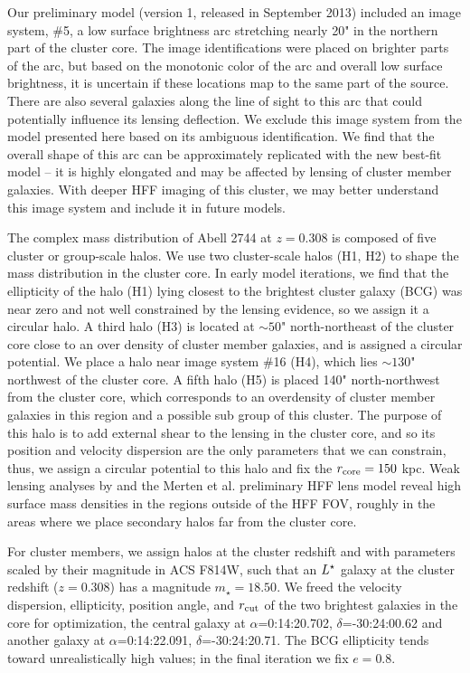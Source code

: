 Our preliminary model (version 1, released in September 2013) included an image system, \#5, a low surface brightness arc stretching nearly 20" in the northern part of the cluster core. The image identifications were placed on brighter parts of the arc, but based on the monotonic color of the arc and overall low surface brightness, it is uncertain if these locations map to the same part of the source. There are also several galaxies along the line of sight to this arc that could potentially influence its lensing deflection. We exclude this image system from the model presented here based on its ambiguous identification. We find that the overall shape of this arc can be approximately replicated with the new best-fit model -- it is highly elongated and may be affected by lensing of cluster member galaxies. With deeper HFF imaging of this cluster, we may better understand this image system and include it in future models.

The complex mass distribution of Abell 2744 at $z=0.308$ is composed of five cluster or group-scale halos. We use two cluster-scale halos (H1, H2) to shape the mass distribution in the cluster core. In early model iterations, we find that the ellipticity of the halo (H1) lying closest to the brightest cluster galaxy (BCG) was near zero and not well constrained by the lensing evidence, so we assign it a circular halo. A third halo (H3) is located at $\sim50$" north-northeast of the cluster core close to an over density of cluster member galaxies, and is assigned a circular potential. We place a halo near image system \#16 (H4), which lies $\sim130$" northwest of the cluster core. A fifth halo (H5) is placed 140" north-northwest from the cluster core, which corresponds to an overdensity of cluster member galaxies in this region and a possible sub group of this cluster. The purpose of this halo is to add external shear to the lensing in the cluster core, and so its position and velocity dispersion are the only parameters that we can constrain, thus, we assign a circular potential to this halo and fix the $r_\mathrm{core}=150$ kpc. Weak lensing analyses by \citet{Merten:2011fk} and the Merten et al. preliminary HFF lens model reveal high surface mass densities in the regions outside of the HFF FOV, roughly in the areas where we place secondary halos far from the cluster core.

For cluster members, we assign halos at the cluster redshift and with parameters scaled by their magnitude in ACS F814W, such that an $L^{\star}$ galaxy at the cluster redshift ($z=0.308$) has a magnitude $m_\star=18.50$. We freed the velocity dispersion, ellipticity, position angle, and $r_\mathrm{cut}$ of the two brightest galaxies in the core for optimization, the central galaxy at $\alpha$=0:14:20.702, $\delta$=-30:24:00.62 and another galaxy at $\alpha$=0:14:22.091, $\delta$=-30:24:20.71. The BCG ellipticity tends toward unrealistically high values; in the final iteration we fix $e=0.8$.

